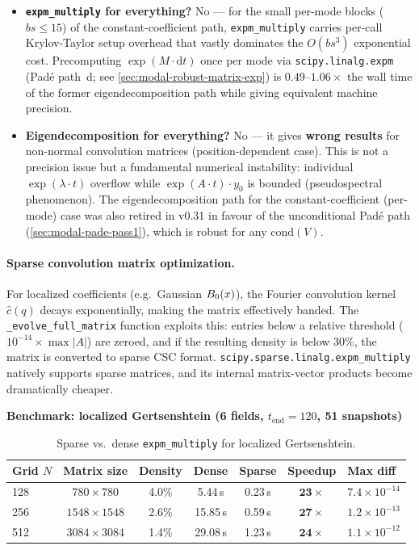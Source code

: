 \begin{itemize}
  \item \textbf{\texttt{expm\_multiply} for everything?} No --- for the small per-mode blocks ($bs \le 15$) of the constant-coefficient path, \texttt{expm\_multiply} carries per-call Krylov-Taylor setup overhead that vastly dominates the $O(bs^3)$ exponential cost. Precomputing $\exp(M \cdot \mathrm{d}t)$ once per mode via \texttt{scipy.linalg.expm} (Pad\'{e} path~d; see \cref{sec:modal-robust-matrix-exp}) is $0.49$--$1.06\times$ the wall time of the former eigendecomposition path while giving equivalent machine precision.
  \item \textbf{Eigendecomposition for everything?} No --- it gives \textbf{wrong results} for non-normal convolution matrices (position-dependent case). This is not a precision issue but a fundamental numerical instability: individual $\exp(\lambda \cdot t)$ overflow while $\exp(A \cdot t) \cdot y_0$ is bounded (pseudospectral phenomenon). The eigendecomposition path for the constant-coefficient (per-mode) case was also retired in v0.31 in favour of the unconditional Pad\'{e} path (\cref{sec:modal-pade-pass1}), which is robust for any $\mathrm{cond}(V)$.
\end{itemize}

\paragraph{Sparse convolution matrix optimization.}
\label{par:modal-sparse}

For localized coefficients (e.g.\ Gaussian $B_0(x)$), the Fourier convolution kernel $\hat{c}(q)$ decays exponentially, making the matrix effectively banded. The \texttt{\_evolve\_full\_matrix} function exploits this: entries below a relative threshold ($10^{-14} \times \max|A|$) are zeroed, and if the resulting density is below 30\%, the matrix is converted to sparse CSC format. \texttt{scipy.sparse.linalg.expm\_multiply} natively supports sparse matrices, and its internal matrix-vector products become dramatically cheaper.

\textbf{Benchmark: localized Gertsenshtein (6 fields, $t_\text{end}=120$, 51 snapshots)}

\begin{table}[htbp]
\centering
\caption{Sparse vs.\ dense \texttt{expm\_multiply} for localized Gertsenshtein.}
\label{tab:sparse-benchmark}
\begin{tabular}{@{}lcccccl@{}}
\toprule
Grid $N$ & Matrix size & Density & Dense & Sparse & Speedup & Max diff \\
\midrule
128 & $780\times 780$ & 4.0\% & 5.44\,s & 0.23\,s & $\mathbf{23\times}$ & $7.4\times 10^{-14}$ \\
256 & $1548\times 1548$ & 2.6\% & 15.85\,s & 0.59\,s & $\mathbf{27\times}$ & $1.2\times 10^{-13}$ \\
512 & $3084\times 3084$ & 1.4\% & 29.08\,s & 1.23\,s & $\mathbf{24\times}$ & $1.1\times 10^{-12}$ \\
\bottomrule
\end{tabular}
\end{table}

